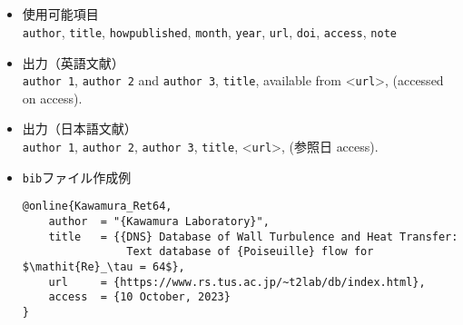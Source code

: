 \documentclass[a4paper,fleqn,uplatex,dvipdfmx]{jsarticle}
\begin{document}
\subsection{\ttonline}
\label{ssec:online}
\begin{screen}
    \begin{itemize}
        \item 使用可能項目 \\
        \verb|author|, \verb|title|, \verb|howpublished|, \verb|month|, \verb|year|, \verb|url|, \verb|doi|, \verb|access|, \verb|note|
        \item 出力（英語文献） \\
            \colorbox[gray]{0.8}{\texttt{author 1}}, \colorbox[gray]{0.8}{\texttt{author 2}} and \colorbox[gray]{0.8}{\texttt{author 3}}, \colorbox[gray]{0.8}{\texttt{title}}, available from \textless\colorbox[gray]{0.8}{\texttt{url}}\textgreater, (accessed on \colorbox[gray]{0.8}{access}).
        \item 出力（日本語文献） \\
            \colorbox[gray]{0.8}{\texttt{author 1}}, \colorbox[gray]{0.8}{\texttt{author 2}}, \colorbox[gray]{0.8}{\texttt{author 3}}, \colorbox[gray]{0.8}{\texttt{title}}, \textless\colorbox[gray]{0.8}{\texttt{url}}\textgreater, (参照日 \colorbox[gray]{0.8}{access}).
        \item \verb|bib|ファイル作成例 \vspace{-3mm}
\begin{verbatim}
@online{Kawamura_Ret64,
    author  = "{Kawamura Laboratory}",
    title   = {{DNS} Database of Wall Turbulence and Heat Transfer: 
                Text database of {Poiseuille} flow for $\mathit{Re}_\tau = 64$},
    url     = {https://www.rs.tus.ac.jp/~t2lab/db/index.html},
    access  = {10 October, 2023}
}
\end{verbatim}
    \end{itemize}
\end{screen}
\end{document}
